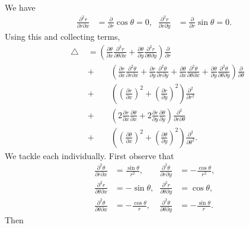 \documentclass[oneside]{article}
\newcommand*\Laplace{\mathop{}\!\mathbin\bigtriangleup}
\begin{document}
\begin{enumerate}[label=\textbf{\arabic*.}]
We have \begin{align*}
  \frac{\partial^2 r}{\partial r\partial x}
  &= \frac{\partial}{\partial r}\cos\theta = 0\text{,}&
  \frac{\partial^2 r}{\partial r\partial y}
  &= \frac{\partial}{\partial r}\sin\theta = 0\text{.}
\end{align*} Using this and collecting terms,\begin{align*}
  \Laplace
  &=
  \left(\frac{\partial\theta}{\partial x}
        \frac{\partial^2 r}{\partial\theta\partial x}
        + \frac{\partial\theta}{\partial y}
           \frac{\partial^2 r}{\partial\theta\partial y}
  \right)\frac{\partial}{\partial r} \\
  &+\qquad\left(
      \frac{\partial r}{\partial x}
      \frac{\partial^2 \theta}{\partial r\partial x}
    + \frac{\partial r}{\partial y}
      \frac{\partial^2 \theta}{\partial r\partial y}
    + \frac{\partial\theta}{\partial x}
        \frac{\partial^2 \theta}{\partial\theta\partial x}
    + \frac{\partial\theta}{\partial y}
      \frac{\partial^2 \theta}{\partial\theta\partial y}
    \right)\frac{\partial}{\partial\theta} \\
  &+\qquad \left(
       \left(\frac{\partial r}{\partial x}\right)^2
       + \left(\frac{\partial r}{\partial y}\right)^2
      \right)\frac{\partial^2}{\partial r^2} \\
  &+\qquad \left(
    2\frac{\partial r}{\partial x}\frac{\partial\theta}{\partial x}
    + 2\frac{\partial r}{\partial y}\frac{\partial\theta}{\partial y}
    \right)\frac{\partial^2}{\partial r\partial\theta} \\
  &+\qquad \left(
    \left(\frac{\partial\theta}{\partial x}\right)^2
    + \left(\frac{\partial\theta}{\partial y}\right)^2
  \right)\frac{\partial^2}{\partial\theta^2} \text{.}
\end{align*} We tackle each individually. First observe that\begin{align*}
  \frac{\partial^2\theta}{\partial r\partial x}
  &= \frac{\sin\theta}{r^2} \text{,} &
  \frac{\partial^2\theta}{\partial r\partial y}
  &= -\frac{\cos\theta}{r^2} \text{,} \\
  \frac{\partial^2r}{\partial\theta\partial x}
  &= -\sin\theta \text{,} &
  \frac{\partial^2r}{\partial\theta\partial y}
  &= \cos\theta \text{,} \\
  \frac{\partial^2\theta}{\partial\theta\partial x}
  &= -\frac{\cos\theta}{r} \text{,} &
  \frac{\partial^2\theta}{\partial\theta\partial y}
  &= -\frac{\sin\theta}{r} \text{.}
\end{align*} Then

\end{enumerate}
\end{document}

